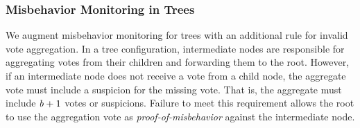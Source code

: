 \subsubsection{Misbehavior Monitoring in Trees}

We augment misbehavior monitoring for trees with an additional rule for invalid vote aggregation.
In a tree configuration, intermediate nodes are responsible for aggregating votes from their children and forwarding them to the root.
However, if an intermediate node does not receive a vote from a child node, the aggregate vote must include a suspicion for the missing vote.
That is, the aggregate must include $\mathit{b} + 1$ votes or suspicions.
Failure to meet this requirement allows the root to use the aggregation vote as \textit{proof-of-misbehavior} against the intermediate node.
